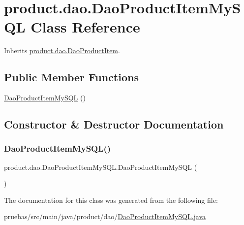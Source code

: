 \hypertarget{classproduct_1_1dao_1_1_dao_product_item_my_s_q_l}{}\section{product.\+dao.\+Dao\+Product\+Item\+My\+S\+QL Class Reference}
\label{classproduct_1_1dao_1_1_dao_product_item_my_s_q_l}


Inherits \mbox{\hyperlink{interfaceproduct_1_1dao_1_1_dao_product_item}{product.\+dao.\+Dao\+Product\+Item}}.

\subsection*{Public Member Functions}
\begin{DoxyCompactItemize}
\item 
\mbox{\hyperlink{classproduct_1_1dao_1_1_dao_product_item_my_s_q_l_af6b4c25ee00afeb0f4ca16d8330143e1}{Dao\+Product\+Item\+My\+S\+QL}} ()
\end{DoxyCompactItemize}


\subsection{Constructor \& Destructor Documentation}
\mbox{\label{classproduct_1_1dao_1_1_dao_product_item_my_s_q_l_af6b4c25ee00afeb0f4ca16d8330143e1}} 
\subsubsection{\texorpdfstring{Dao\+Product\+Item\+My\+S\+Q\+L()}{DaoProductItemMySQL()}}
{\footnotesize\ttfamily product.\+dao.\+Dao\+Product\+Item\+My\+S\+Q\+L.\+Dao\+Product\+Item\+My\+S\+QL (\begin{DoxyParamCaption}{ }\end{DoxyParamCaption})}



The documentation for this class was generated from the following file\+:\begin{DoxyCompactItemize}
\item 
pruebas/src/main/java/product/dao/\mbox{\hyperlink{_dao_product_item_my_s_q_l_8java}{Dao\+Product\+Item\+My\+S\+Q\+L.\+java}}\end{DoxyCompactItemize}

